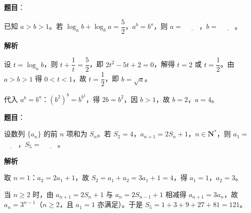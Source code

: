 \begin{answer}

\textbf{题目}：

已知 \(a>b>1\)。若 \(\log_{a}b+\log_{b}a=\dfrac{5}{2}\)，\(a^{b}=b^{a}\)，则 \(a=\) \(\underline{\qquad}\)，\(b=\) \(\underline{\qquad}\)。

\textbf{解析}

设 \(t=\log_{a}b\)，则 \(t+\dfrac{1}{t}=\dfrac{5}{2}\)，即 \(2t^{2}-5t+2=0\)，解得 \(t=2\) 或 \(t=\dfrac{1}{2}\)。由 \(a>b>1\) 得 \(0<t<1\)，故 \(t=\dfrac{1}{2}\)，即 \(b=\sqrt{a}\)。

代入 \(a^{b}=b^{a}\)：\((b^{2})^{b}=b^{b^{2}}\)，得 \(2b=b^{2}\)，因 \(b>1\)，故 \(b=2\)，\(a=4\)。


\end{answer}
\begin{answer}

\textbf{题目}：

设数列 \(\{a_{n}\}\) 的前 \(n\) 项和为 \(S_{n}\)。若 \(S_{2}=4\)，\(a_{n+1}=2S_{n}+1\)，\(n\in\mathbf{N}^{*}\)，则 \(a_{1}=\) \(\underline{\qquad}\)，\(S_{5}=\) \(\underline{\qquad}\)。

\textbf{解析}

取 \(n=1\)：\(a_{2}=2a_{1}+1\)，故 \(S_{2}=a_{1}+a_{2}=3a_{1}+1=4\)，得 \(a_{1}=1\)，\(a_{2}=3\)。

当 \(n\geqslant 2\) 时，由 \(a_{n+1}=2S_{n}+1\) 与 \(a_{n}=2S_{n-1}+1\) 相减得 \(a_{n+1}=3a_{n}\)，故 \(a_{n}=3^{n-1}\)（\(n\geqslant 2\)，且 \(a_{1}=1\) 亦满足）。于是 \(S_{5}=1+3+9+27+81=121\)。


\end{answer}
